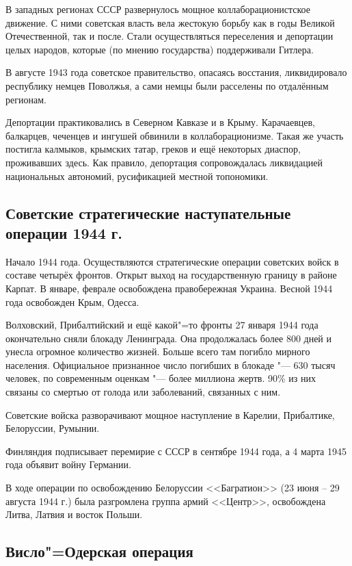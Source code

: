 В западных регионах СССР развернулось мощное коллаборационистское движение. С ними советская власть вела жестокую борьбу как в годы Великой Отечественной, так и после. Стали осуществляться переселения и депортации целых народов, которые (по мнению государства) поддерживали  Гитлера.

В августе 1943 года советское правительство, опасаясь восстания, ликвидировало республику немцев Поволжья, а сами немцы были расселены по отдалённым регионам.

Депортации практиковались в Северном Кавказе и в Крыму. Карачаевцев, балкарцев, чеченцев и ингушей обвинили в коллаборационизме. Такая же участь постигла калмыков, крымских татар, греков и ещё некоторых диаспор, проживавших здесь. Как правило, депортация сопровождалась ликвидацией национальных автономий, русификацией местной топономики.

\subsection{Советские стратегические наступательные операции 1944 г.}

Начало 1944 года. Осуществляются стратегические операции советских войск в составе четырёх фронтов. Открыт выход на государственную границу в районе Карпат. В январе, феврале освобождена правобережная Украина. Весной 1944 года освобожден Крым, Одесса.

Волховский, Прибалтийский и ещё какой"=то фронты 27 января 1944 года окончательно сняли блокаду Ленинграда. Она продолжалась более 800 дней и унесла огромное количество жизней. Больше всего там погибло мирного населения. Официальное признанное число погибших в блокаде "--- 630 тысяч человек, по современным оценкам "--- более миллиона жертв. 90\% из них связаны со смертью от голода или заболеваний, связанных с ним.

Советские войска разворачивают мощное наступление в Карелии, Прибалтике, Белоруссии, Румынии.

Финляндия подписывает перемирие с СССР в сентябре 1944 года, а 4 марта 1945 года объявит войну Германии.

В ходе операции по освобождению Белоруссии <<Багратион>> (23 июня -- 29 августа 1944 г.) была разгромлена группа армий <<Центр>>, освобождена Литва, Латвия и восток Польши.

\subsection{Висло"=Одерская операция}

